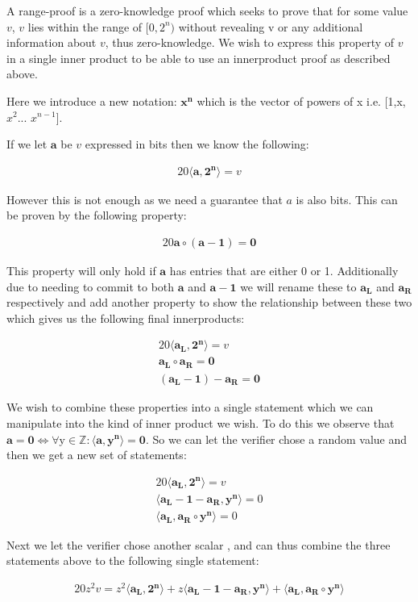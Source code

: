 \documentclass{article}
\newcommand{\eq}[1]{\begin{alignat*}{20}#1\end{alignat*}}
\renewcommand{\vec}[1]{\boldsymbol{#1}}
\newcommand{\ran}[1]{\text{#1}}
\newcommand{\vecran}[1]{\mathbf{#1}}
\newcommand{\dotp}[2]{\langle #1, #2 \rangle}
\begin{document}
A range-proof is a zero-knowledge proof which seeks to prove that for some value $v$, $v$ lies within the range of $[0,2^n)$ without revealing v or any additional information about $v$, thus zero-knowledge. We wish to express this property of $v$ in a single inner product to be able to use an innerproduct proof as described above. 

Here we introduce a new notation: $\vec{x^n}$ which is the vector of powers of x i.e. [1,x,$x^2$... $x^{n-1}$].

If we let $\vec{a}$ be $v$ expressed in bits then we know the following:

\eq{\dotp{\vec{a}}{\vec{2^n}} = v}

However this is not enough as we need a guarantee that $a$ is also bits. This can be proven by the following property: 

\eq{\vec{a}\circ (\vec{a} - \vec{1}) = \vec{0}}

This property will only hold if $\vec{a}$ has entries that are either 0 or 1. Additionally due to needing to commit to both $\vec{a}$ and $\vec{a} - \vec{1}$ we will rename these to $\vec{a_L}$ and $\vec{a_R}$ respectively and add another property to show the relationship between these two which gives us the following final innerproducts:

\eq{
	\dotp{\vec{a_L}}{\vec{2^n}} = v \\
	\vec{a_L}\circ \vec{a_R} = \vec{0} \\
	(\vec{a_L} - \vec{1}) - \vec{a_R} = \vec{0}
}

We wish to combine these properties into a single statement which we can manipulate into the kind of inner product we wish. To do this we observe that $\vec{a} = \vec{0} \iff \forall \ran{y}\in\mathbb{Z}: \dotp{\vec{a}}{\vec{y^n}} = \vec{0}$. So we can let the verifier chose a random value \ran{y} and then we get a new set of statements:

\eq{
	\dotp{\vec{a_L}}{\vec{2^n}} = v \\
	\dotp{\vec{a_L} - \vec{1} - \vec{a_R}}{\vecran{y^n}} = 0 \\
	\dotp{\vec{a_L}}{\vec{a_R}\circ \vecran{y^n}} = 0
}

Next we let the verifier chose another scalar \ran{z}, and can thus combine the three statements above to the following single statement: 

\eq{
	z^2v = 
	z^2\dotp{\vec{a_L}}{\vec{2^n}} +
	z\dotp{\vec{a_L} - \vec{1} - \vec{a_R}}{\vecran{y^n}} +
	\dotp{\vec{a_L}}{\vec{a_R}\circ \vecran{y^n}}
}
\end{document}
